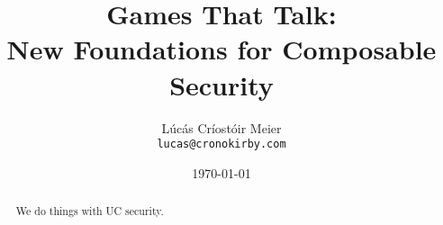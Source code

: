 

\date{\today}
\title{Games That Talk:\\New Foundations for Composable Security}
\author{Lúcás Críostóir Meier\\\texttt{lucas@cronokirby.com}}



\maketitle

\begin{abstract}
    We do things with UC security.
\end{abstract}











{\small }
\clearpage
\appendix


